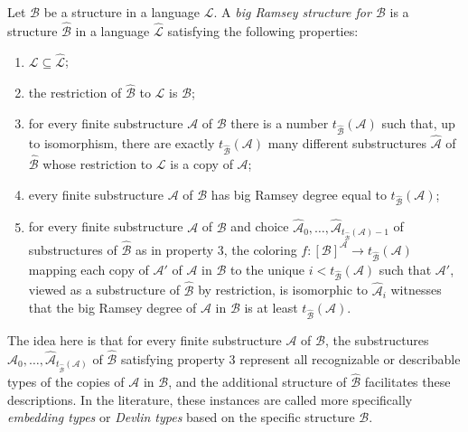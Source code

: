 \begin{definition}\label{def:big-ramsey-structure}
	Let $\mathcal{B}$ be a structure in a language $\mathscr{L}$. A \emph{big Ramsey structure for $\mathcal{B}$} is a structure $\hat{\mathcal{B}}$ in a language $\hat{\mathscr{L}}$ satisfying the following properties:
	\begin{enumerate}
		\item $\mathscr{L} \subseteq \hat{\mathscr{L}}$;
		\item the restriction of $\hat{\mathcal{B}}$ to $\mathscr{L}$ is $\mathcal{B}$;
		\item for every finite substructure $\mathcal{A}$ of $\mathcal{B}$ there is a number $t_{\hat{\mathcal{B}}}(\mathcal{A})$ such that, up to isomorphism, there are exactly $t_{\hat{\mathcal{B}}}(\mathcal{A})$ many different substructures $\hat{\mathcal{A}}$ of $\hat{\mathcal{B}}$ whose restriction to $\mathscr{L}$ is a copy of $\mathcal{A}$;
		\item every finite substructure $\mathcal{A}$ of $\mathcal{B}$ has big Ramsey degree equal to $t_{\hat{\mathcal{B}}}(\mathcal{A})$;
		\item for every finite substructure $\mathcal{A}$ of $\mathcal{B}$ and choice $\hat{\mathcal{A}}_0,\ldots,\hat{\mathcal{A}}_{t_{\hat{\mathcal{B}}}(\mathcal{A})-1}$ of substructures of $\hat{\mathcal{B}}$ as in property 3, the coloring $f : [\mathcal{B}]^\mathcal{A} \to t_{\hat{\mathcal{B}}}(\mathcal{A})$ mapping each copy of $\mathcal{A}'$ of $\mathcal{A}$ in $\mathcal{B}$ to the unique $i < t_{\hat{\mathcal{B}}}(\mathcal{A})$ such that $\mathcal{A}'$, viewed as a substructure of $\hat{\mathcal{B}}$ by restriction, is isomorphic to $\hat{\mathcal{A}}_i$ witnesses that the big Ramsey degree of $\mathcal{A}$ in $\mathcal{B}$ is at least $t_{\hat{\mathcal{B}}}(\mathcal{A})$.
	\end{enumerate}
\end{definition}

\noindent The idea here is that for every finite substructure $\mathcal{A}$ of $\mathcal{B}$, the substructures $\hat{\mathcal{A}}_0,\ldots,\hat{\mathcal{A}}_{t_{\hat{\mathcal{B}}}(\mathcal{A})}$ of $\hat{\mathcal{B}}$ satisfying property 3 represent all recognizable or describable types of the copies of $\mathcal{A}$ in $\mathcal{B}$, and the additional structure of $\hat{\mathcal{B}}$ facilitates these descriptions. In the literature, these instances are called more specifically \emph{embedding types} or \emph{Devlin types} based on the specific structure $\mathcal{B}$.

